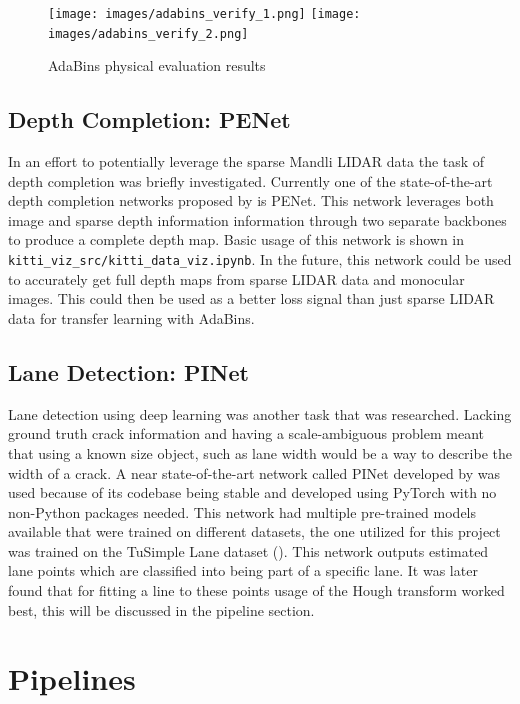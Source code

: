 \documentclass{article}
\begin{document}
\begin{figure}[ht]
\begin{center}
\texttt{[image: images/adabins\_verify\_1.png]}
\texttt{[image: images/adabins\_verify\_2.png]}
\end{center}
\caption{AdaBins physical evaluation results}
\label{fig:ada_bins_verify}
\end{figure}

\subsection{Depth Completion: PENet}
In an effort to potentially leverage the sparse Mandli LIDAR data the task of depth completion was briefly investigated. 
Currently one of the state-of-the-art depth completion networks proposed by \cite{PENet} is PENet.
This network leverages both image and sparse depth information information through two separate backbones to produce a complete depth map.
Basic usage of this network is shown in \verb|kitti_viz_src/kitti_data_viz.ipynb|.
In the future, this network could be used to accurately get full depth maps from sparse LIDAR data and monocular images. This could then be used as a better loss signal than just sparse LIDAR data for transfer learning with AdaBins.

\subsection{Lane Detection: PINet}
Lane detection using deep learning was another task that was researched.
Lacking ground truth crack information and having a scale-ambiguous problem meant that using a known size object, such as lane width would be a way to describe the width of a crack.
A near state-of-the-art network called PINet developed by \cite{PINet} was used because of its codebase being stable and developed using PyTorch with no non-Python packages needed.
This network had multiple pre-trained models available that were trained on different datasets, the one utilized for this project was trained on the TuSimple Lane dataset (\cite{tusimple}).
This network outputs estimated lane points which are classified into being part of a specific lane.
It was later found that for fitting a line to these points usage of the Hough transform worked best, this will be discussed in the pipeline section.

\section{Pipelines}
\end{document}
